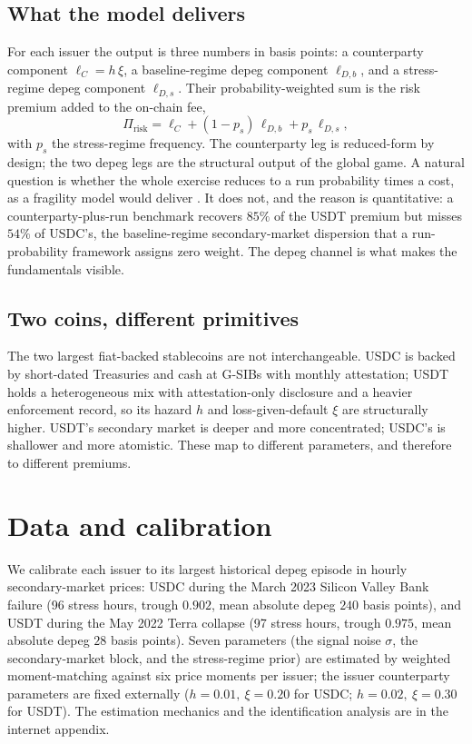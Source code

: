 \documentclass[12pt]{article}
\begin{document}
\subsection{What the model delivers}\label{sub:what_it_delivers}

For each issuer the output is three numbers in basis points: a counterparty component $\ell_C=h\,\xi$, a baseline-regime depeg component $\ell_{D,b}$, and a stress-regime depeg component $\ell_{D,s}$. Their probability-weighted sum is the risk premium added to the on-chain fee,
\begin{equation}\label{eq:total_risk_premium}
\Pi_{\text{risk}} = \ell_C + (1-p_s)\,\ell_{D,b} + p_s\,\ell_{D,s},
\end{equation}
with $p_s$ the stress-regime frequency. The counterparty leg is reduced-form by design; the two depeg legs are the structural output of the global game. A natural question is whether the whole exercise reduces to a run probability times a cost, as a fragility model would deliver \citep{klee_etal_2026_fragility}. It does not, and the reason is quantitative: a counterparty-plus-run benchmark recovers $85\%$ of the USDT premium but misses $54\%$ of USDC's, the baseline-regime secondary-market dispersion that a run-probability framework assigns zero weight. The depeg channel is what makes the fundamentals visible.

\subsection{Two coins, different primitives}\label{sub:not_homogeneous}

The two largest fiat-backed stablecoins are not interchangeable. USDC is backed by short-dated Treasuries and cash at G-SIBs with monthly attestation; USDT holds a heterogeneous mix with attestation-only disclosure and a heavier enforcement record, so its hazard $h$ and loss-given-default $\xi$ are structurally higher. USDT's secondary market is deeper and more concentrated; USDC's is shallower and more atomistic. These map to different parameters, and therefore to different premiums.

\section{Data and calibration}\label{sec:calibration}

We calibrate each issuer to its largest historical depeg episode in hourly secondary-market prices: USDC during the March 2023 Silicon Valley Bank failure (96 stress hours, trough $0.902$, mean absolute depeg $240$ basis points), and USDT during the May 2022 Terra collapse (97 stress hours, trough $0.975$, mean absolute depeg $28$ basis points). Seven parameters (the signal noise $\sigma$, the secondary-market block, and the stress-regime prior) are estimated by weighted moment-matching against six price moments per issuer; the issuer counterparty parameters are fixed externally ($h=0.01,\ \xi=0.20$ for USDC; $h=0.02,\ \xi=0.30$ for USDT). The estimation mechanics and the identification analysis are in the internet appendix.
\end{document}
